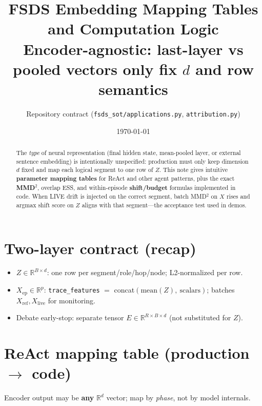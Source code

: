 \documentclass[11pt]{article}
\title{FSDS Embedding Mapping Tables and Computation Logic\\[0.25em]
\large Encoder-agnostic: last-layer vs pooled vectors only fix $d$ and row semantics}
\author{Repository contract (\texttt{fsds\_sot/applications.py}, \texttt{attribution.py})}
\date{\today}
\begin{document}
\maketitle

\begin{abstract}
The \emph{type} of neural representation (final hidden state, mean-pooled layer, or external sentence embedding) is intentionally unspecified: production must only keep dimension $d$ fixed and map each logical segment to one row of $Z$.
This note gives intuitive \textbf{parameter mapping tables} for ReAct and other agent patterns, plus the exact \textbf{MMD}$^2$, overlap ESS, and within-episode \textbf{shift/budget} formulas implemented in code.
When LIVE drift is injected on the correct segment, batch MMD$^2$ on $X$ rises and argmax shift score on $Z$ aligns with that segment---the acceptance test used in demos.
\end{abstract}

\section{Two-layer contract (recap)}
\begin{itemize}[nosep]
  \item $Z\in\mathbb{R}^{B\times d}$: one row per segment/role/hop/node; L2-normalized per row.
  \item $X_{\mathrm{ep}}\in\mathbb{R}^{p}$: \texttt{trace\_features} $=$ concat$(\mathrm{mean}(Z),\ \text{scalars})$; batches $X_{\mathrm{ref}}, X_{\mathrm{live}}$ for monitoring.
  \item Debate early-stop: separate tensor $E\in\mathbb{R}^{R\times B\times d}$ (not substituted for $Z$).
\end{itemize}

\section{ReAct mapping table (production $\rightarrow$ code)}
\label{tab:react-map}
Encoder output may be \textbf{any} $\mathbb{R}^d$ vector; map by \emph{phase}, not by model internals.
\end{document}
